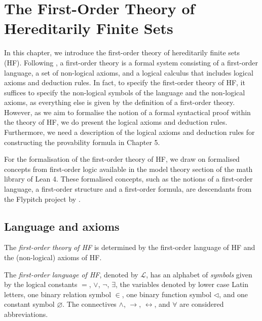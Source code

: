 \chapter{The First-Order Theory of Hereditarily Finite Sets}

In this chapter, we introduce the first-order theory of hereditarily finite sets (HF).
Following \cite{shoenfield1967mathematical}, a first-order theory is a formal system
consisting of a first-order language, a set of non-logical axioms, and a logical calculus 
that includes logical axioms and deduction rules.
In fact, to specify the first-order theory of HF, it suffices to specify 
the non-logical symbols of the language and the non-logical axioms, as everything else is
given by the definition of a first-order theory.
However, as we aim to formalise the notion of a formal syntactical proof within the theory of HF,
we do present the logical axioms and deduction rules.
Furthermore, we need a description of the logical axioms and deduction rules for 
constructing the provability formula in Chapter 5.

For the formalisation of the first-order theory of HF,
we draw on formalised concepts from first-order logic available in 
the model theory section of the math library of Lean 4.
These formalised concepts, such as the notions of a first-order language,
a first-order structure and a first-order formula, are descendants from 
the Flypitch project by \cite{han2020formal}.

\section{Language and axioms}

The \textit{first-order theory of HF} is determined by the first-order language of HF and 
the (non-logical) axioms of HF.

\begin{definition}
    \label{def:Lang}
    \leanok
    The \textit{first-order language of HF}, denoted by $\mathcal{L}$, 
    has an alphabet of \textit{symbols} given by the 
    logical constants $=$, $\lor$, $\neg$, $\exists$, the variables denoted by 
    lower case Latin letters, one binary relation symbol $\in$, one binary function symbol $\lhd$, 
    and one constant symbol $\varnothing$.
    The connectives $\land$, $\rightarrow$, $\leftrightarrow$, and $\forall$ are considered 
    abbreviations.
\end{definition}

